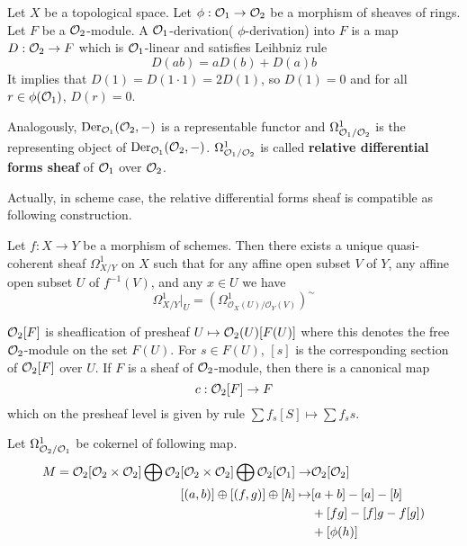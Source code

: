 \begin{mydefn}
Let $X$ be a topological space. Let $\phi: \mathcal{O}_{1} \rightarrow \mathcal{O}_{2}$ be a morphism of sheaves of rings. Let $F$ be a $\mathcal{O}_{2}$-module. A $\mathcal{O}_1$-derivation( $\phi$-derivation) into $F$ is a map $D: \mathcal{O}_2 \rightarrow F$ which is $\mathcal{O}_1$-linear and satisfies Leihbniz rule
\[
D(ab)=aD(b)+D(a)b
\]
It implies that $D(1)=D(1\cdot 1)=2D(1)$, so $D(1)=0$ and for all $r \in \phi(\mathcal{O}_1)$, $D(r)=0$.
\par
Analogously, $\text{Der}_{\mathcal{O}_1}(\mathcal{O}_2,-)$ is a representable functor and $\Omega_{\mathcal{O}_1/\mathcal{O}_2}^1$ is the representing object of $\text{Der}_{\mathcal{O}_1}(\mathcal{O}_2,-)$. $\Omega_{\mathcal{O}_1/\mathcal{O}_2}^1$ is called \textbf{relative differential forms sheaf} of $\mathcal{O}_1$ over $\mathcal{O}_2$.
\end{mydefn}
Actually, in scheme case, the relative differential forms sheaf is compatible as following construction.
\begin{prop}
Let $f: X \rightarrow Y$ be a morphism of schemes. Then there exists a unique quasi-coherent sheaf $\Omega_{X/Y}^1$ on $X$ such that for any affine open subset $V$ of $Y$, any affine open subset $U$ of $ f^{-1}(V)$, and any $x \in U$ we have
\[
\Omega_{X/Y}^{1}|_{U}= (\Omega^{1}_{\mathcal{O}_{X}(U)/\mathcal{O}_{Y}(V)})^{\sim}
\]
\end{prop}
$\mathcal{O}_{2}[F]$ is sheaflication of presheaf $U \mapsto \mathcal{O}_{2}(U)[F(U)]$ where this denotes the free $\mathcal{O}_{2}$-module on the set $F(U)$. For $s \in F(U)$, $[s]$ is the corresponding section of $\mathcal{O}_{2}[F]$ over $U$. If $F$ is a sheaf of $\mathcal{O}_2$-module, then there is a canonical map
\[
c: \mathcal{O}_2 [F] \rightarrow F
\]
which on the presheaf level is given by rule $\sum f_{s}[S] \mapsto \sum f_{s}s$.
\par
Let $\Omega_{\mathcal{O}_{2}/\mathcal{O}_{1}}^{1}$ be cokernel of following map.
\begin{align*}
	M= \mathcal{O}_{2}[\mathcal{O}_{2} \times \mathcal{O}_{2}] \bigoplus \mathcal{O}_{2}[\mathcal{O}_{2} \times \mathcal{O}_{2}] \bigoplus \mathcal{O}_{2}[\mathcal{O}_{1}] \rightarrow& \mathcal{O}_{2}[\mathcal{O}_{2}]\\
	[(a,b)] \oplus [(f,g)] \oplus [h] \mapsto& [a+b] - [a]-[b]\\
	&+[fg]-[f]g-f[g]) \\
	&+[\phi(h)]
\end{align*}
